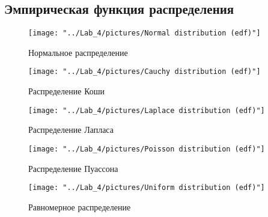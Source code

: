 \documentclass[12pt,a4paper]{article}
\begin{document}
	\subsection{Эмпирическая функция распределения}
		\begin{center}
			\begin{figure}[H]
				\texttt{[image: "../Lab\_4/pictures/Normal distribution (edf)"]} 
				\caption[Нормальное распределение]{Нормальное распределение}
			\end{figure}
			
			\begin{figure}[H]
				\texttt{[image: "../Lab\_4/pictures/Cauchy distribution (edf)"]}
				\caption[Распределение Коши]{Распределение Коши}
			\end{figure}
			
			\begin{figure}[H]
				\texttt{[image: "../Lab\_4/pictures/Laplace distribution (edf)"]}
				\caption[Распределение Лапласа]{Распределение Лапласа}
			\end{figure}
			
			\begin{figure}[H]
				\texttt{[image: "../Lab\_4/pictures/Poisson distribution (edf)"]}
				\caption[Распределение Пуассона]{Распределение Пуассона}
			\end{figure}
			
			\begin{figure}[H]			
				\texttt{[image: "../Lab\_4/pictures/Uniform distribution (edf)"]}
				\caption[Равномерное распределение]{Равномерное распределение}
			\end{figure}
		\end{center}
	
\end{document}
